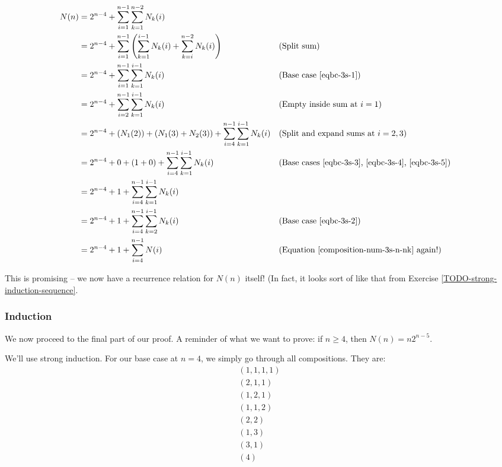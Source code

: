 \begin{align*}
N(n) &= 2^{n-4} + \sum_{i=1}^{n-1} \sum_{k=1}^{n-2} N_{k}(i) \\
&= 2^{n-4} + \sum_{i=1}^{n-1} \left( \sum_{k=1}^{i-1} N_{k}(i) + \sum_{k=i}^{n-2} N_{k}(i) \right) && \text{(Split sum)} \\
&= 2^{n-4} + \sum_{i=1}^{n-1} \sum_{k=1}^{i-1} N_{k}(i) && \text{(Base case \ref{eqbc-3s-1})} \\
&= 2^{n-4} + \sum_{i=2}^{n-1} \sum_{k=1}^{i-1} N_{k}(i) && \text{(Empty inside sum at $i=1$)} \\
&= 2^{n-4} + \left( N_1(2) \right) + \left( N_1(3) + N_2(3) \right) + \sum_{i=4}^{n-1} \sum_{k=1}^{i-1} N_{k}(i) && \text{(Split and expand sums at $i=2,3$)} \\
&= 2^{n-4} + 0 + \left( 1 + 0 \right) + \sum_{i=4}^{n-1} \sum_{k=1}^{i-1} N_{k}(i) && \text{(Base cases \ref{eqbc-3s-3}, \ref{eqbc-3s-4}, \ref{eqbc-3s-5})} \\
&= 2^{n-4} + 1 + \sum_{i=4}^{n-1} \sum_{k=1}^{i-1} N_{k}(i) \\
&= 2^{n-4} + 1 + \sum_{i=4}^{n-1} \sum_{k=2}^{i-1} N_{k}(i) && \text{(Base case \ref{eqbc-3s-2})} \\
&= 2^{n-4} + 1 + \sum_{i=4}^{n-1} N(i) && \text{(Equation \ref{composition-num-3s-n-nk} again!)} \\
\end{align*}

This is promising -- we now have a recurrence relation for $N(n)$ itself! (In fact, it looks sort of like that from Exercise \ref{TODO-strong-induction-sequence}. 


\subsubsection{Induction}

We now proceed to the final part of our proof. A reminder of what we want to prove: if $n \geq 4$, then $N(n) = n2^{n-5}$.

We'll use strong induction. For our base case at $n = 4$, we simply go through all compositions. They are:
\begin{gather*}
(1, 1, 1, 1) \\
(2, 1, 1) \\
(1, 2, 1) \\
(1, 1, 2) \\
(2, 2) \\
(1, 3) \\
(3, 1) \\
(4)
\end{gather*}


